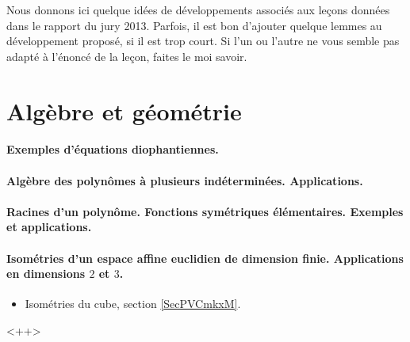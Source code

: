 
Nous donnons ici quelque idées de développements associés aux leçons données dans le rapport du jury 2013\cite{VDPpTKg}. Parfois, il est bon d'ajouter quelque lemmes au développement proposé, si il est trop court. Si l'un ou l'autre ne vous semble pas adapté à l'énoncé de la leçon, faites le moi savoir.

\section{Algèbre et géométrie}

\paragraph{Exemples d’équations diophantiennes.}
\paragraph{Algèbre des polynômes à plusieurs indéterminées. Applications.}
\paragraph{Racines d’un polynôme. Fonctions symétriques élémentaires. Exemples et applications.}
\paragraph{Isométries d'un espace affine euclidien de dimension finie. Applications en dimensions $2$ et $3$.}
\begin{itemize}
    \item Isométries du cube, section \ref{SecPVCmkxM}.
\end{itemize}
<++>
